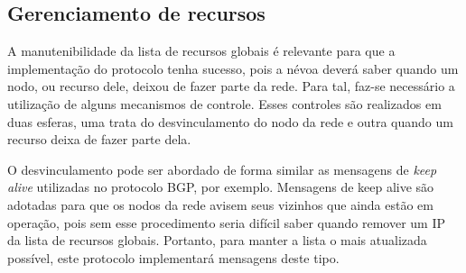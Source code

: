 

\subsection{Gerenciamento de recursos}

A manutenibilidade da lista de recursos globais é relevante para que a implementação do protocolo tenha sucesso, pois a névoa deverá saber quando um nodo, ou recurso dele, deixou de fazer parte da rede.
Para tal, faz-se necessário a utilização de alguns mecanismos de controle.
Esses controles são realizados em duas esferas, uma trata do desvinculamento do nodo da rede e outra quando um recurso deixa de fazer parte dela.

O desvinculamento pode ser abordado de forma similar as mensagens de \textit{keep alive} utilizadas no protocolo BGP, por exemplo.
Mensagens de keep alive são adotadas para que os nodos da rede avisem seus vizinhos que ainda estão em operação, pois sem esse procedimento seria difícil
saber quando remover um IP da lista de recursos globais. Portanto, para manter a lista o mais atualizada possível, este protocolo implementará mensagens deste tipo.











